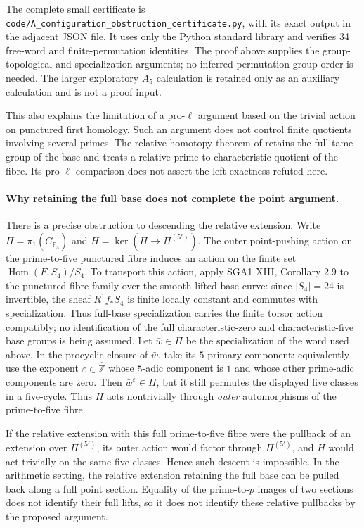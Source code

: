 The complete small certificate is
\texttt{code/A\_configuration\_obstruction\_certificate.py}, with
its exact output in the adjacent JSON file. It uses only the Python
standard library and verifies 34 free-word and finite-permutation
identities. The proof above supplies the group-topological and
specialization arguments; no inferred permutation-group order is
needed. The larger exploratory $A_5$ calculation is retained only
as an auxiliary calculation and is not a proof input.

This also explains the limitation of a pro-$\ell$ argument based on
the trivial action on punctured first homology. Such an argument
does not control finite quotients involving several primes. The
relative homotopy theorem of
\citet[Theorem C, Corollary 1.14 and Lemma 3.5]{A_HoshiSawadaTsujimura2024}
retains the full tame group of the base and treats a relative
prime-to-characteristic quotient of the fibre. Its pro-$\ell$
comparison does not assert the left exactness refuted here.

\paragraph{Why retaining the full base does not complete the point argument.}
There is a precise obstruction to descending the relative extension.
Write $\Pi=\pi_1(C_{\overline{\mathbb F}_5})$ and
$H=\ker(\Pi\to\Pi^{(5')})$. The outer point-pushing action on the
prime-to-five punctured fibre induces an action on the finite set
$\operatorname{Hom}(F,S_4)/S_4$. To transport this action, apply
SGA1 XIII, Corollary 2.9 to the punctured-fibre family over the
smooth lifted base curve: since $|S_4|=24$ is invertible, the sheaf
$R^1f_*S_4$ is finite locally constant and commutes with
specialization. Thus full-base specialization carries the finite
torsor action compatibly; no identification of the full
characteristic-zero and characteristic-five base groups is being
assumed. Let $\bar w\in\Pi$ be the specialization of the word
used above. In the procyclic closure of $\bar w$, take
its $5$-primary component: equivalently use the exponent
$\varepsilon\in\widehat{\mathbb Z}$ whose $5$-adic component is
$1$ and whose other prime-adic components are zero. Then
$\bar w^\varepsilon\in H$, but it still permutes the displayed
five classes in a five-cycle. Thus $H$ acts nontrivially through
\emph{outer} automorphisms of the prime-to-five fibre.

If the relative extension with this full prime-to-five fibre were
the pullback of an extension over $\Pi^{(5')}$, its outer action
would factor through $\Pi^{(5')}$, and $H$ would act trivially on
the same five classes. Hence such descent is impossible. In the
arithmetic setting, the relative extension retaining the full base
can be pulled back along a full point section. Equality of the
prime-to-$p$ images of two sections does not identify their full
lifts, so it does not identify these relative pullbacks by the
proposed argument.

